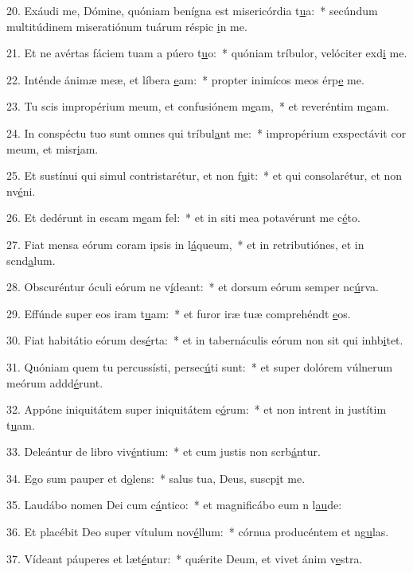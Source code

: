 20. Exáudi me, Dómine, quóniam benígna est misericórdia t\uline{u}a:~* secúndum multitúdinem miseratiónum tuárum réspic \uline{i}n me.\par 
21. Et ne avértas fáciem tuam a púero t\uline{u}o:~* quóniam tríbulor, velóciter exd\uline{i} me.\par 
22. Inténde ánimæ meæ, et líbera \uline{e}am:~* propter inimícos meos érp\uline{e} me.\par 
23. Tu scis impropérium meum, et confusiónem m\uline{e}am,~* et reveréntim m\uline{e}am.\par 
24. In conspéctu tuo sunt omnes qui tríbul\uline{a}nt me:~* impropérium exspectávit cor meum, et misr\uline{i}am.\par 
25. Et sustínui qui simul contristarétur, et non f\uline{u}it:~* et qui consolarétur, et non nv\uline{é}ni.\par 
26. Et dedérunt in escam m\uline{e}am fel:~* et in siti mea potavérunt me c\uline{é}to.\par 
27. Fiat mensa eórum coram ipsis in l\uline{á}queum,~* et in retributiónes, et in scnd\uline{a}lum.\par 
28. Obscuréntur óculi eórum ne v\uline{í}deant:~* et dorsum eórum semper nc\uline{ú}rva.\par 
29. Effúnde super eos iram t\uline{u}am:~* et furor iræ tuæ comprehéndt \uline{e}os.\par 
30. Fiat habitátio eórum des\uline{é}rta:~* et in tabernáculis eórum non sit qui inhb\uline{i}tet.\par 
31. Quóniam quem tu percussísti, persec\uline{ú}ti sunt:~* et super dolórem vúlnerum meórum addd\uline{é}runt.\par 
32. Appóne iniquitátem super iniquitátem e\uline{ó}rum:~* et non intrent in justítim t\uline{u}am.\par 
33. Deleántur de libro viv\uline{é}ntium:~* et cum justis non scrb\uline{á}ntur.\par 
34. Ego sum pauper et d\uline{o}lens:~* salus tua, Deus, suscp\uline{i}t me.\par 
35. Laudábo nomen Dei cum c\uline{á}ntico:~* et magnificábo eum n l\uline{au}de:\par 
36. Et placébit Deo super vítulum nov\uline{é}llum:~* córnua producéntem et ng\uline{u}las.\par 
37. Vídeant páuperes et læt\uline{é}ntur:~* quǽrite Deum, et vivet ánim v\uline{e}stra.\par 
